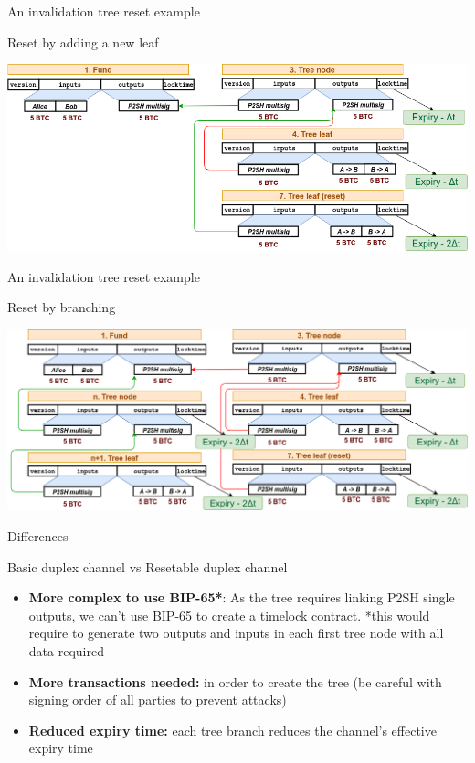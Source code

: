 \documentclass{beamer}
\begin{document}
\begin{frame}{An invalidation tree reset example}
 \begin{exampleblock}{Reset by adding a new leaf}
  \begin{center}
   \includegraphics[width=\textwidth, height=0.8\textheight, keepaspectratio]{img/bidir_tree.png}
  \end{center}
 \end{exampleblock}
\end{frame}
\begin{frame}{An invalidation tree reset example}
 \begin{exampleblock}{Reset by branching}
  \begin{center}
   \includegraphics[width=\textwidth, height=0.8\textheight, keepaspectratio]{img/bidir_tree_expanded.png}
  \end{center}
 \end{exampleblock}
\end{frame}
\begin{frame}{Differences}
 \begin{block}{Basic duplex channel vs Resetable duplex channel}
  \begin{itemize}[<+->]
   \item \textbf{More complex to use BIP-65*}: As the tree requires linking P2SH single outputs, we can't use BIP-65 to create a timelock contract.
         \pause
         \small{*this would require to generate two outputs and inputs in each first tree node with all data required}
   \item \textbf{More transactions needed:} in order to create the tree (be careful with signing order of all parties to prevent attacks)
   \item \textbf{Reduced expiry time:} each tree branch reduces the channel's effective expiry time
  \end{itemize}
 \end{block}
\end{frame}
\end{document}
